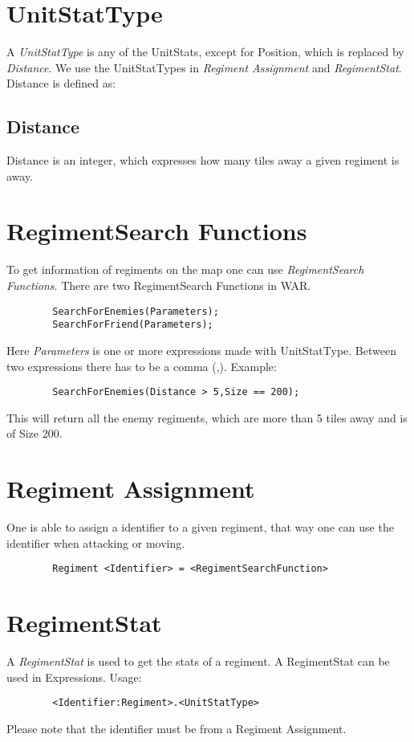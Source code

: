 \section{UnitStatType}
	A {\it UnitStatType} is any of the UnitStats, except for Position, which is replaced by {\it Distance}. We use the UnitStatTypes in 
	{\it Regiment Assignment} and {\it RegimentStat}.
	Distance is defined as: \\
	\subsection{Distance}
		Distance is an integer, which expresses how many tiles away a given regiment is away.
\section{RegimentSearch Functions}
	To get information of regiments on the map one can use {\it RegimentSearch Functions}. There are two RegimentSearch Functions in WAR.\\
	\begin{verbatim}
		SearchForEnemies(Parameters);
		SearchForFriend(Parameters);
	\end{verbatim}
	Here {\it Parameters} is one or more expressions made with UnitStatType. Between two expressions there has to be a comma (,).
	Example: \\
	\begin{verbatim}
		SearchForEnemies(Distance > 5,Size == 200);
	\end{verbatim}
	This will return all the enemy regiments, which are more than 5 tiles away and is of Size 200.
\section{Regiment Assignment}
\label{doc:regass}
	One is able to assign a identifier to a given regiment, that way one can use the identifier when attacking or moving.
	\begin{verbatim}
		Regiment <Identifier> = <RegimentSearchFunction>
	\end{verbatim}
\section{RegimentStat}
	A {\it RegimentStat} is used to get the stats of a regiment. A RegimentStat can be used in Expressions. Usage:\\
	\begin{verbatim}
		<Identifier:Regiment>.<UnitStatType>
	\end{verbatim}
	Please note that the identifier must be from a Regiment Assignment.

